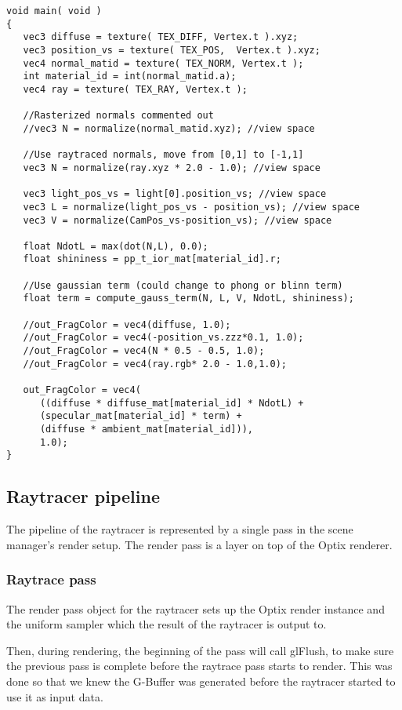 \begin{lstlisting}
void main( void )
{
   vec3 diffuse = texture( TEX_DIFF, Vertex.t ).xyz;
   vec3 position_vs = texture( TEX_POS,  Vertex.t ).xyz;
   vec4 normal_matid = texture( TEX_NORM, Vertex.t );
   int material_id = int(normal_matid.a);
   vec4 ray = texture( TEX_RAY, Vertex.t );
	
   //Rasterized normals commented out
   //vec3 N = normalize(normal_matid.xyz); //view space

   //Use raytraced normals, move from [0,1] to [-1,1]
   vec3 N = normalize(ray.xyz * 2.0 - 1.0); //view space

   vec3 light_pos_vs = light[0].position_vs; //view space
   vec3 L = normalize(light_pos_vs - position_vs); //view space
   vec3 V = normalize(CamPos_vs-position_vs); //view space
	
   float NdotL = max(dot(N,L), 0.0);
   float shininess = pp_t_ior_mat[material_id].r;
	
   //Use gaussian term (could change to phong or blinn term)
   float term = compute_gauss_term(N, L, V, NdotL, shininess);
    
   //out_FragColor = vec4(diffuse, 1.0);
   //out_FragColor = vec4(-position_vs.zzz*0.1, 1.0);
   //out_FragColor = vec4(N * 0.5 - 0.5, 1.0);
   //out_FragColor = vec4(ray.rgb* 2.0 - 1.0,1.0);
    
   out_FragColor = vec4( 
      ((diffuse * diffuse_mat[material_id] * NdotL) + 
      (specular_mat[material_id] * term) + 
      (diffuse * ambient_mat[material_id])), 
      1.0);
}
\end{lstlisting}

\subsection{Raytracer pipeline}
The pipeline of the raytracer is represented by a single pass in the scene manager's render setup. The render pass is a layer on top of the Optix renderer.

\subsubsection{Raytrace pass}
The render pass object for the raytracer sets up the Optix render instance and the uniform sampler which the result of the raytracer is output to.

Then, during rendering, the beginning of the pass will call glFlush, to make sure the previous pass is complete before the raytrace pass starts to render. This was done so that we knew the G-Buffer was generated before the raytracer started to use it as input data.

